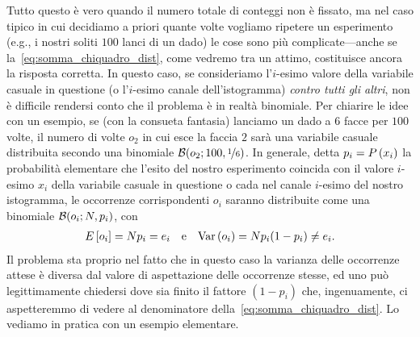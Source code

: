 Tutto questo è vero quando il numero totale di conteggi non è fissato, ma
nel caso tipico in cui decidiamo a priori quante volte vogliamo ripetere un
esperimento (e.g., i nostri soliti $100$ lanci di un dado) le cose sono più
complicate---anche se la~\eqref{eq:somma_chiquadro_dist}, come vedremo tra un
attimo, costituisce ancora la risposta corretta. In questo caso, se consideriamo
l'$i$-esimo valore della variabile casuale in questione (o l'$i$-esimo canale
dell'istogramma) \emph{contro tutti gli altri}, non è difficile rendersi conto
che il problema è in realtà binomiale. Per chiarire le idee con un
esempio, se (con la consueta fantasia) lanciamo un dado a $6$ facce per $100$
volte, il numero di volte $o_2$ in cui esce la faccia $2$ sarà una
variabile casuale distribuita secondo una binomiale
$\binomialpdf[100, \nicefrac{1}{6}]{o_2}$. In generale, detta $p_i = \displaystyle P\left(x_i\right)$
la probabilità elementare che l'esito del nostro esperimento coincida con il
valore $i$-esimo $x_i$ della variabile casuale in questione o cada nel canale
$i$-esimo del nostro istogramma, le occorrenze corrispondenti $o_i$ saranno
distribuite come una binomiale $\binomialpdf[N, p_i]{o_i}$, con
\begin{align}
  \displaystyle E\left[o_i\right] = N p_i = e_i \quad \text{e} \quad
  \text{Var}\left(o_i\right) = N p_i(1 - p_i) \neq e_i.
\end{align}
Il problema sta proprio nel fatto che in questo caso la varianza delle
occorrenze attese è diversa dal valore di aspettazione delle occorrenze
stesse, ed uno può legittimamente chiedersi dove sia finito il fattore
$(1 - p_i)$ che, ingenuamente, ci aspetteremmo di vedere al denominatore
della~\eqref{eq:somma_chiquadro_dist}. Lo vediamo in pratica con un esempio
elementare.

